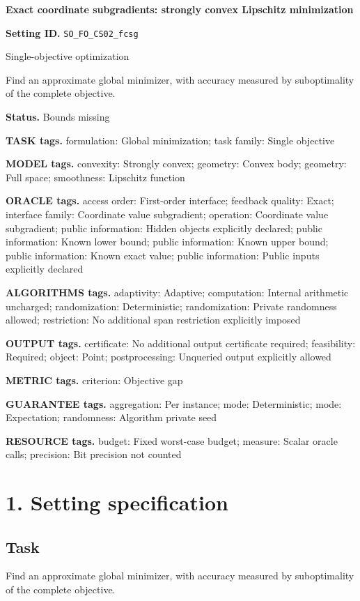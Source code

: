 \documentclass[10pt,a4paper]{article}
\begin{document}
\raggedright

{\LARGE\bfseries\sffamily\color{AtlasNavy} Exact coordinate subgradients: strongly convex Lipschitz minimization\par}\vspace{5pt}
\textbf{Setting ID.} \texttt{SO\_\allowbreak{}FO\_\allowbreak{}CS02\_\allowbreak{}fcsg}

Single-objective optimization

Find an approximate global minimizer, with accuracy measured by suboptimality of the complete objective.

\textbf{Status.} Bounds missing

\textbf{TASK tags.} formulation: Global minimization; task family: Single objective

\textbf{MODEL tags.} convexity: Strongly convex; geometry: Convex body; geometry: Full space; smoothness: Lipschitz function

\textbf{ORACLE tags.} access order: First-order interface; feedback quality: Exact; interface family: Coordinate value subgradient; operation: Coordinate value subgradient; public information: Hidden objects explicitly declared; public information: Known lower bound; public information: Known upper bound; public information: Known exact value; public information: Public inputs explicitly declared

\textbf{ALGORITHMS tags.} adaptivity: Adaptive; computation: Internal arithmetic uncharged; randomization: Deterministic; randomization: Private randomness allowed; restriction: No additional span restriction explicitly imposed

\textbf{OUTPUT tags.} certificate: No additional output certificate required; feasibility: Required; object: Point; postprocessing: Unqueried output explicitly allowed

\textbf{METRIC tags.} criterion: Objective gap

\textbf{GUARANTEE tags.} aggregation: Per instance; mode: Deterministic; mode: Expectation; randomness: Algorithm private seed

\textbf{RESOURCE tags.} budget: Fixed worst-case budget; measure: Scalar oracle calls; precision: Bit precision not counted

\section{1. Setting specification}
\subsection{Task}
Find an approximate global minimizer, with accuracy measured by suboptimality of the complete objective.
\end{document}
